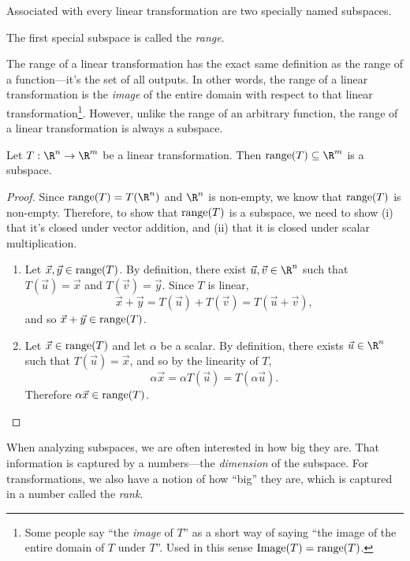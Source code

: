 
Associated with every linear transformation
are two specially named subspaces. 

The first special subspace is called the \emph{range}.

The range of a linear transformation has the exact same definition as the range of a function---it's the set of all outputs.
In other words, the range of a linear transformation is the \emph{image} of the entire domain with respect to that linear
transformation\footnote{ Some people say ``the \emph{image} of $T$'' as a short way of saying ``the image
of the entire domain of $T$ under $T$''. Used in this sense $\text{Image}(T)=\operatorname{range}(T)$.}. However, unlike the range of an arbitrary function, the range of a linear transformation
is always a subspace.

\begin{theorem}
	Let $T:\R^n\to\R^m$ be a linear transformation. Then $\Range(T)\subseteq \R^m$ is a 
	subspace.
\end{theorem}
\begin{proof}
	Since $\Range(T)=T(\R^n)$ and $\R^n$ is non-empty, we know that $\operatorname{range}(T)$ is non-empty.
	Therefore, to show that $\operatorname{range}(T)$ is a subspace, we need to show (i) that it's closed under vector addition,
	and (ii) that it is closed under scalar multiplication.
	\begin{enumerate}[label=(\roman*)]
		\item Let $\vec x,\vec y\in\operatorname{range}(T)$.
			By definition, there exist $\vec u,\vec v\in\R^n$ such that $T(\vec u)=\vec x$
			and $T(\vec v)=\vec y$. Since $T$ is linear,
			\[
				\vec x+\vec y=T(\vec u)+T(\vec v)=T(\vec u+\vec v),
			\]
			and so $\vec x+\vec y\in\operatorname{range}(T)$.
		\item Let $\vec x\in\operatorname{range}(T)$ and let $\alpha$ be a scalar.
			By definition, there exists $\vec u\in\R^n$ such that $T(\vec u)=\vec x$,
			and so by the linearity of $T$,
			\[
			\alpha\vec x=\alpha T(\vec u)=T(\alpha\vec u).
			\]
			Therefore $\alpha\vec x\in\operatorname{range}(T)$.
	\end{enumerate}
\end{proof}

When analyzing subspaces, we are often interested in how big they are. That information is captured by a numbers---the
\emph{dimension} of the subspace. For transformations, we also have a notion of how ``big'' they are, which is captured
in a number called the \emph{rank}.


